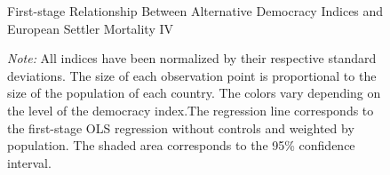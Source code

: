 \begin{figure}[H]
\centering
\caption{First-stage Relationship Between Alternative Democracy Indices and European Settler Mortality IV}
\label{fig:first-stage-indices}
\centering
{}
   \caption*{ \textit{Note:} All indices have been normalized by their respective standard deviations. The size of each observation point is proportional to the size of the population of each country. The colors vary depending on the level of the democracy index.The regression line corresponds to the first-stage OLS regression without controls and weighted by population. The shaded area corresponds to the 95\% confidence interval.}
  
\end{figure}